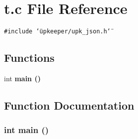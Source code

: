 \section{t.c File Reference}
\label{t_8c}
{\tt \#include \char`\"{}upkeeper/upk\_\-json.h\char`\"{}}\par
\subsection*{Functions}
\begin{CompactItemize}
\item 
int \bf{main} ()
\end{CompactItemize}


\subsection{Function Documentation}
\subsubsection{\setlength{\rightskip}{0pt plus 5cm}int main ()}\label{t_8c_446c6b9a1a4dbab517fbb760870458a3}


